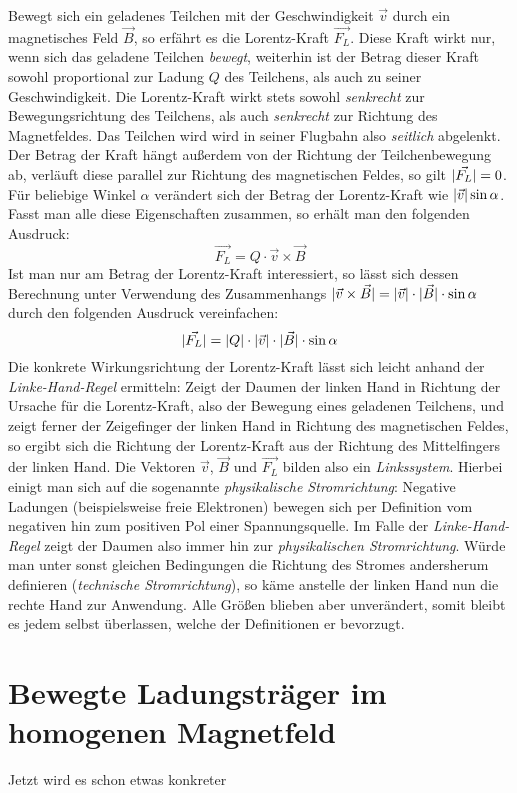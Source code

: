 Bewegt sich ein geladenes Teilchen mit der Geschwindigkeit \(\vec{v}\) durch ein magnetisches Feld \(\vec{B}\),
so erf\"ahrt es die Lorentz-Kraft \(\vec{F_L}\). Diese Kraft wirkt nur, wenn sich das geladene Teilchen \textit{bewegt}, weiterhin
ist der Betrag dieser Kraft sowohl proportional zur Ladung \(Q\) des Teilchens, als auch zu seiner Geschwindigkeit.
Die Lorentz-Kraft wirkt stets sowohl \textit{senkrecht} zur Bewegungsrichtung des Teilchens, als auch \textit{senkrecht} zur Richtung
des Magnetfeldes. Das Teilchen wird wird in seiner Flugbahn also
\textit{seitlich} abgelenkt. Der Betrag der Kraft h\"angt au{\ss}erdem von der Richtung der Teilchenbewegung ab, verl\"auft diese
parallel zur Richtung des magnetischen Feldes, so gilt \(\lvert\vec{F_L}\rvert = 0\). F\"ur beliebige Winkel \(\alpha\) ver\"andert
sich der Betrag der Lorentz-Kraft wie \(\lvert\vec{v}\rvert\sin{\alpha}\).
Fasst man alle diese Eigenschaften zusammen, so erh\"alt man den folgenden Ausdruck:
\begin{equation}
  \vec{F_L} = Q \cdot \vec{v} \times \vec{B}
\end{equation}
Ist man nur am Betrag der Lorentz-Kraft interessiert, so l\"asst sich dessen Berechnung unter Verwendung des Zusammenhangs
\(\lvert\vec{v} \times \vec{B}\rvert = \lvert\vec{v}\rvert \cdot \lvert\vec{B}\rvert \cdot \sin{\alpha} \) durch den folgenden Ausdruck vereinfachen:
\begin{equation}
  \lvert\vec{F_L}\rvert = \lvert Q\rvert \cdot \lvert\vec{v}\rvert \cdot \lvert\vec{B}\rvert \cdot \sin{\alpha}
\end{equation}
Die konkrete Wirkungsrichtung der Lorentz-Kraft l\"asst sich leicht anhand der \textit{Linke-Hand-Regel} ermitteln:
Zeigt der Daumen der linken Hand in Richtung der Ursache f\"ur die Lorentz-Kraft, also der Bewegung eines geladenen Teilchens,
und zeigt ferner der Zeigefinger der linken Hand in Richtung des magnetischen Feldes, so ergibt sich die Richtung der
Lorentz-Kraft aus der Richtung des Mittelfingers der linken Hand. Die Vektoren \(\vec{v}\), \(\vec{B}\) und \(\vec{F_L}\)
bilden also ein \textit{Linkssystem}.
Hierbei einigt man sich auf die sogenannte \textit{physikalische Stromrichtung}: Negative Ladungen (beispielsweise
freie Elektronen) bewegen sich per Definition vom negativen hin zum positiven Pol einer Spannungsquelle. Im Falle der
\textit{Linke-Hand-Regel} zeigt der Daumen also immer hin zur \textit{physikalischen Stromrichtung}.
W\"urde man unter sonst gleichen Bedingungen die Richtung des Stromes andersherum definieren (\textit{technische Stromrichtung}),
so k\"ame anstelle der linken Hand nun die rechte Hand zur Anwendung. Alle Gr\"o{\ss}en blieben aber unver\"andert, somit bleibt es
jedem selbst \"uberlassen, welche der Definitionen er bevorzugt.

\section{Bewegte Ladungstr\"ager im homogenen Magnetfeld}

Jetzt wird es schon etwas konkreter
